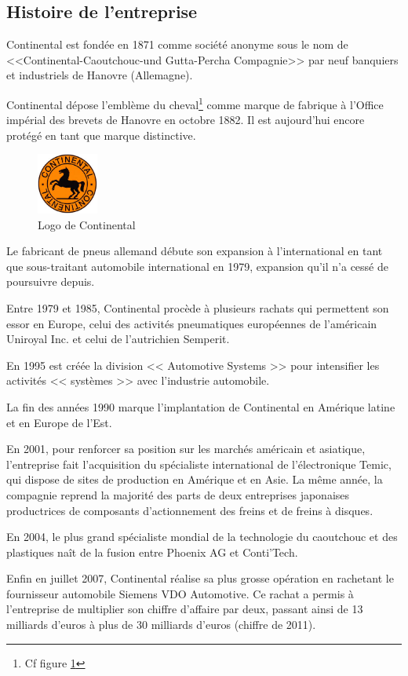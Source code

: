 		\subsection{Histoire de l'entreprise}
		Continental est fondée en 1871 comme société anonyme sous le nom de <<Continental-Caoutchouc-und Gutta-Percha Compagnie>> par neuf banquiers et industriels de Hanovre (Allemagne).

		Continental dépose l'emblème du cheval\footnote{Cf figure \ref{fig:logo}} comme marque de fabrique à l'Office impérial des brevets de Hanovre en octobre 1882. Il est aujourd'hui encore protégé en tant que marque distinctive.
		\begin{figure}[H]
			\centering
			\includegraphics[width=2cm]{contents/images/logo.jpg}
			\caption{Logo de Continental}
			\label{fig:logo}
		\end{figure}

		Le fabricant de pneus allemand débute son expansion à l'international en tant que sous-traitant automobile international en 1979, expansion qu'il n'a cessé de poursuivre depuis.
		
Entre 1979 et 1985, Continental procède à plusieurs rachats qui permettent son essor en Europe, celui des activités pneumatiques européennes de l'américain Uniroyal Inc. et celui de l'autrichien Semperit.

En 1995 est créée la division << Automotive Systems >> pour intensifier les activités << systèmes >> avec l'industrie automobile.

La fin des années 1990 marque l'implantation de Continental en Amérique latine et en Europe de l'Est.

En 2001, pour renforcer sa position sur les marchés américain et asiatique, l'entreprise fait l'acquisition du spécialiste international de l'électronique Temic, qui dispose de sites de production en Amérique et en Asie. La même année, la compagnie reprend la majorité des parts de deux entreprises japonaises productrices de composants d'actionnement des freins et de freins à disques. 

En 2004, le plus grand spécialiste mondial de la technologie du caoutchouc et des plastiques naît de la fusion entre Phoenix AG et Conti'Tech.

Enfin en juillet 2007, Continental réalise sa plus grosse opération en rachetant le fournisseur automobile Siemens VDO Automotive. Ce rachat a permis à l'entreprise de multiplier son chiffre d'affaire par deux, passant ainsi de 13 milliards d'euros à plus de 30 milliards d'euros (chiffre de 2011).
		
